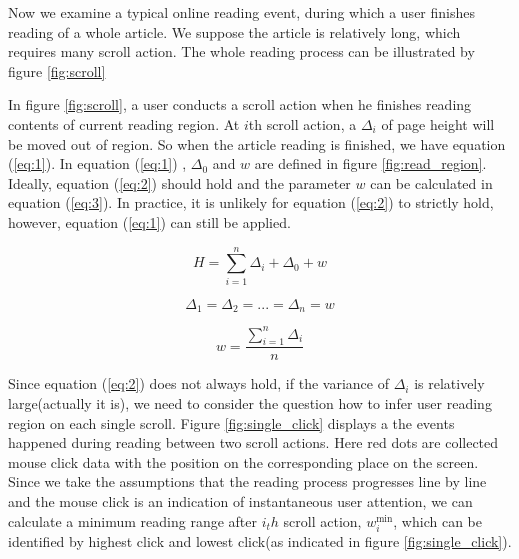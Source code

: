 \documentclass{sigchi}
\begin{document}
Now we examine a typical online reading event, during which a user finishes reading of a whole article. We suppose 
 the article is relatively long, which requires many scroll action. 
The whole reading process can be illustrated by figure \ref{fig:scroll}


In figure \ref{fig:scroll}, a user conducts a scroll action when he finishes reading contents of current reading region. 
At $i$th scroll action, a $\Delta_i$ of page height will be moved out of region. So when the article reading is finished, 
we have equation (\ref{eq:1}). In equation (\ref{eq:1}) , $\Delta_0$ and $w$ are defined in figure 
\ref{fig:read_region}. Ideally, equation (\ref{eq:2}) should hold and the parameter $w$ can be 
calculated in equation (\ref{eq:3}). In practice, it is unlikely for equation (\ref{eq:2}) to strictly hold,
however, equation (\ref{eq:1}) can still be applied. 

\begin{equation} \label{eq:1}
	H = \sum\limits_{i = 1}^n {{\Delta _i} + {\Delta _0} + w} 
\end{equation}

\begin{equation} \label{eq:2}
	{\Delta _1} = {\Delta _2} = ... = {\Delta _n} = w
\end{equation}

\begin{equation} \label{eq:3}
	w = \frac{{\sum\limits_{i = 1}^n {{\Delta _i}} }}{n}
\end{equation}


Since equation (\ref{eq:2}) does not always hold, if the variance of $\Delta_i$ is relatively large(actually it is),
we need to consider the question how to infer user reading  region on each single scroll. Figure \ref{fig:single_click}
displays a the events happened during  reading between two scroll actions. Here red dots are collected mouse click data with
the position on the corresponding place on the screen. Since we take the assumptions that the reading process progresses 
line by line and the mouse click is an indication of instantaneous user attention, we can calculate a minimum reading range after $i_th$ scroll action, 
$w_i^{\min }$, which can be identified by highest click and lowest click(as indicated in figure  \ref{fig:single_click}). 
\end{document}

